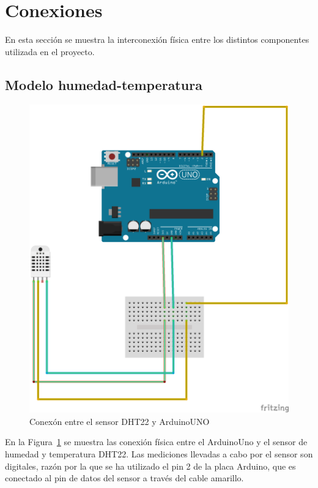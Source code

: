 \section{Conexiones}\label{sec:conexiones}

En esta secci\'on se muestra la interconexi\'on f\'isica entre los
distintos componentes utilizada en el proyecto.

\subsection{Modelo humedad-temperatura}
\begin{center}
\begin{figure}[h]\label{fig:dht22}
\includegraphics{images/dht22_bb.png}
\caption{Conex\'on entre el sensor DHT22 y ArduinoUNO}
\end{figure}
\end{center}
En la Figura~\ref{fig:dht22} se muestra las conexi\'on f\'isica entre
el ArduinoUno y el sensor de humedad y temperatura DHT22.
Las mediciones llevadas a cabo por el sensor son digitales, raz\'on
por la que se ha utilizado el pin 2 de la placa Arduino, que es
conectado al pin de datos del sensor a trav\'es del cable amarillo.

